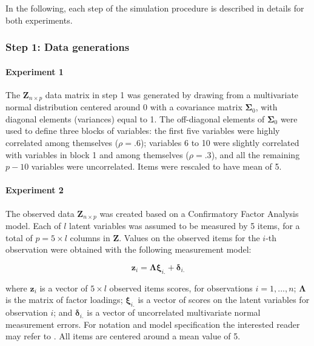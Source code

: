 	In the following, each step of the simulation procedure is described in details for both experiments.


\subsubsection{Step 1: Data generations}

	\paragraph{Experiment 1} 
	The $\bm{Z}_{n \times p}$ data matrix in step 1 was generated by drawing from a multivariate normal 
	distribution centered around 0 with a covariance matrix $\bm{\Sigma}_0$, with diagonal elements 
	(variances) equal to 1. 
	The off-diagonal elements of $\bm{\Sigma}_0$ were used to define three blocks of variables: 
	the first five variables were highly correlated among themselves ($\rho = .6$); 
	variables 6 to 10 were slightly correlated with variables in block 1 and among themselves ($\rho = .3$), 
	and all the remaining $p-10$ variables were uncorrelated.
	Items were rescaled to have mean of 5.

	\paragraph{Experiment 2}
	The observed data $\bm{Z}_{n \times p}$ was created based on a Confirmatory Factor Analysis model.
	Each of $l$ latent variables was assumed to be measured by 5 items, for a total of $p = 5 \times l$ 
	columns in $\bm{Z}$.
	Values on the observed items for the $i$-th observation were obtained with the following measurement 
	model:

	\begin{equation}
		\bm{z}_i = \bm{\Lambda} \bm{\xi}_{i.} + \bm{\delta}_{i.}
	\end{equation}

	where $\bm{z}_i$ is a vector of $5 \times l$ observed items scores, for observations $i = 1, ..., n$;
	$\bm{\Lambda}$ is the matrix of factor loadings; $\bm{\xi}_{i.}$ is a vector of scores on the
	latent variables for observation $i$; and $\bm{\delta}_{i.}$ is a vector of uncorrelated multivariate 
	normal measurement errors.
	For notation and model specification the interested reader may refer to \cite{bollen:1989}.
	All items are centered around a mean value of 5.

